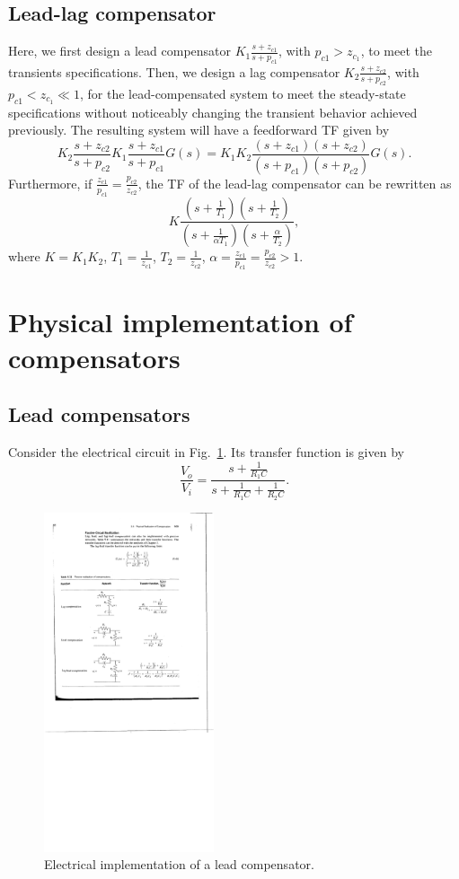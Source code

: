 \documentclass[a4paper,11pt]{report}
\theoremstyle{definition}
\begin{document}
\subsection{Lead-lag compensator}

Here, we first design a lead compensator
$K_1\frac{s+z_{c1}}{s+p_{c1}}$, with $p_{c1}>z_{c_1}$, to meet the
transients specifications. Then, we design a lag compensator
$K_2\frac{s+z_{c2}}{s+p_{c2}}$, with $p_{c1}<z_{c_1}\ll 1$, for the
lead-compensated system to meet the steady-state specifications
without noticeably changing the transient behavior achieved
previously. The resulting system will have a feedforward TF given by
\[
K_2\frac{s+z_{c2}}{s+p_{c2}}K_1\frac{s+z_{c1}}{s+p_{c1}}G(s) =
K_1K_2\frac{(s+z_{c1})(s+z_{c2})}{(s+p_{c1})(s+p_{c2})} G(s).
\]
Furthermore, if $\frac{z_{c1}}{p_{c1}}=\frac{p_{c2}}{z_{c2}}$, the TF
of the lead-lag compensator can be rewritten as
\[
K\frac{(s+\frac{1}{T_1})(s+\frac{1}{T_2})}{(s+\frac{1}{\alpha
    T_1})(s+\frac{\alpha}{T_2})},
\]
where $K=K_1K_2$, $T_1=\frac{1}{z_{c1}}$, $T_2=\frac{1}{z_{c2}}$,
$\alpha=\frac{z_{c1}}{p_{c1}}=\frac{p_{c2}}{z_{c2}}>1$.


\section{Physical implementation of compensators}


\subsection{Lead compensators}

Consider the electrical circuit in Fig.~\ref{fig:impl-lead}. Its
transfer function is given by
\[
\frac{V_o}{V_i} = \frac{s+\frac{1}{R_1C}}{s+\frac{1}{R_1C}+\frac{1}{R_2C}}.
\]

\begin{figure}[H]
  \centering
  \includegraphics[width=5cm]{fig/impl-lead.pdf}
  \caption{Electrical implementation of a lead compensator.}
  \label{fig:impl-lead}
\end{figure}
\end{document}

